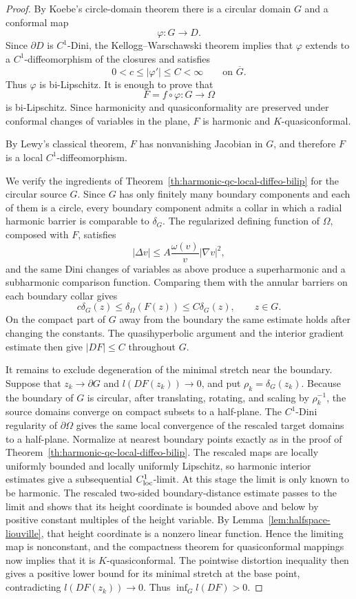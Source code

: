 \documentclass[11pt]{amsart}
\theoremstyle{definition}
\theoremstyle{remark}
\begin{document}
\begin{proof}
By Koebe's circle-domain theorem there is a circular domain \(G\) and a
conformal map
\[
        \varphi:G\to D.
\]
Since \(\partial D\) is \(C^1\)-Dini, the Kellogg--Warschawski theorem
implies that \(\varphi\) extends to a \(C^1\)-diffeomorphism of the
closures and satisfies
\[
        0<c\le |\varphi'|\le C<\infty
        \qquad\text{on }\overline G .
\]
Thus \(\varphi\) is bi-Lipschitz.  It is enough to prove that
\[
        F=f\circ\varphi:G\to\Omega
\]
is bi-Lipschitz.  Since harmonicity and quasiconformality are preserved
under conformal changes of variables in the plane, \(F\) is harmonic and
\(K\)-quasiconformal.

By Lewy's classical theorem, \(F\) has nonvanishing Jacobian in \(G\), and
therefore \(F\) is a local \(C^1\)-diffeomorphism.

We verify the ingredients of
Theorem~\ref{th:harmonic-qc-local-diffeo-bilip} for the circular source
\(G\). Since \(G\) has only finitely many boundary components and each of
them is a circle, every boundary component admits a collar in which a
radial harmonic barrier is comparable to \(\delta_G\). The regularized
defining function of \(\Omega\), composed with \(F\), satisfies
\[
        |\Delta v|\le A\frac{\omega(v)}{v}|\nabla v|^2,
\]
and the same Dini changes of variables as above produce a superharmonic
and a subharmonic comparison function. Comparing them with the annular
barriers on each boundary collar gives
\[
        c\delta_G(z)\le \delta_\Omega(F(z))\le C\delta_G(z),
        \qquad z\in G.
\]
On the compact part of \(G\) away from the boundary the same estimate
holds after changing the constants. The quasihyperbolic argument and the
interior gradient estimate then give \(|DF|\le C\) throughout \(G\).

It remains to exclude degeneration of the minimal stretch near the
boundary. Suppose that \(z_k\to\partial G\) and
\(l(DF(z_k))\to0\), and put \(\rho_k=\delta_G(z_k)\). Because the
boundary of \(G\) is circular, after translating, rotating, and scaling
by \(\rho_k^{-1}\), the source domains converge on compact subsets to a
half-plane. The \(C^1\)-Dini regularity of \(\partial\Omega\) gives the
same local convergence of the rescaled target domains to a half-plane.
Normalize at nearest boundary points exactly as in the proof of
Theorem~\ref{th:harmonic-qc-local-diffeo-bilip}. The rescaled maps are
locally uniformly bounded and locally uniformly Lipschitz, so harmonic
interior estimates give a subsequential \(C^1_{\rm loc}\)-limit. At this
stage the limit is only known to be harmonic. The rescaled two-sided
boundary-distance estimate passes to the limit and shows that its height
coordinate is bounded above and below by positive constant multiples of
the height variable. By Lemma~\ref{lem:halfspace-liouville}, that height
coordinate is a nonzero linear function. Hence the limiting map is
nonconstant, and the compactness theorem for quasiconformal mappings now
implies that it is \(K\)-quasiconformal. The pointwise distortion
inequality then gives a positive lower bound for its minimal stretch at
the base point, contradicting \(l(DF(z_k))\to0\). Thus
\(\inf_G l(DF)>0\).


\end{proof}
\end{document}
